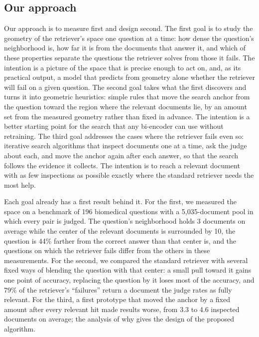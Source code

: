 \documentclass[12pt,a4paper]{article}
\begin{document}
\subsection{Our approach}
\label{sec:approach}

Our approach is to measure first and design second. The first goal is to study the geometry of the retriever's space one question at a time: how dense the question's neighborhood is, how far it is from the documents that answer it, and which of these properties separate the questions the retriever solves from those it fails. The intention is a picture of the space that is precise enough to act on, and, as its practical output, a model that predicts from geometry alone whether the retriever will fail on a given question. The second goal takes what the first discovers and turns it into geometric heuristics: simple rules that move the search anchor from the question toward the region where the relevant documents lie, by an amount set from the measured geometry rather than fixed in advance. The intention is a better starting point for the search that any bi-encoder can use without retraining. The third goal addresses the cases where the retriever fails even so: iterative search algorithms that inspect documents one at a time, ask the judge about each, and move the anchor again after each answer, so that the search follows the evidence it collects. The intention is to reach a relevant document with as few inspections as possible exactly where the standard retriever needs the most help.

Each goal already has a first result behind it. For the first, we measured the space on a benchmark of 196 biomedical questions with a 5,035-document pool in which every pair is judged. The question's neighborhood holds 3 documents on average while the center of the relevant documents is surrounded by 10, the question is 44\% farther from the correct answer than that center is, and the questions on which the retriever fails differ from the others in these measurements. For the second, we compared the standard retriever with several fixed ways of blending the question with that center: a small pull toward it gains one point of accuracy, replacing the question by it loses most of the accuracy, and 79\% of the retriever's ``failures'' return a document the judge rates as fully relevant. For the third, a first prototype that moved the anchor by a fixed amount after every relevant hit made results worse, from 3.3 to 4.6 inspected documents on average; the analysis of why gives the design of the proposed algorithm.
\end{document}
